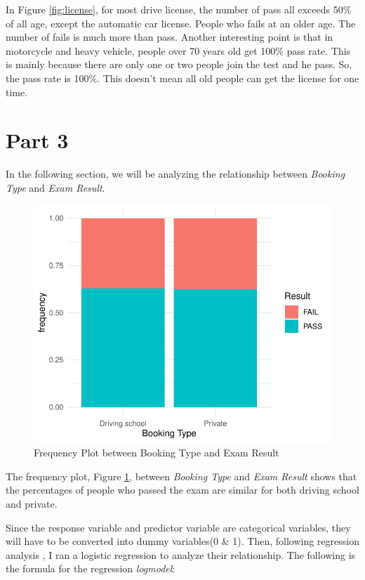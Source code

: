 \documentclass[11pt,a4paper,]{article}
\begin{document}
In Figure \ref{fig:license}, for most drive license, the number of pass all exceeds 50\% of all age, except the automatic car license. People who fails at an older age. The number of fails is much more than pass.
Another interesting point is that in motorcycle and heavy vehicle, people over 70 years old get 100\% pass rate. This is mainly because there are only one or two people join the test and he pass. So, the pass rate is 100\%. This doesn't mean all old people can get the license for one time.

\section*{Part 3}

In the following section, we will be analyzing the relationship between \emph{Booking Type} and \emph{Exam Result}.

\begin{figure}

{\centering \includegraphics{Assignment4_files/figure-latex/frequency-1} 

}

\caption{Frequency Plot between Booking Type and Exam Result}\label{fig:frequency}
\end{figure}

The frequency plot, Figure \ref{fig:frequency}, between \emph{Booking Type} and \emph{Exam Result} shows that the percentages of people who passed the exam are similar for both driving school and private.

Since the response variable and predictor variable are categorical variables, they will have to be converted into dummy variables(0 \& 1). Then, following regression analysis \textcite{logisticregregression}, I ran a logistic regression to analyze their relationship. The following is the formula for the regression \emph{logmodel}:
\end{document}
